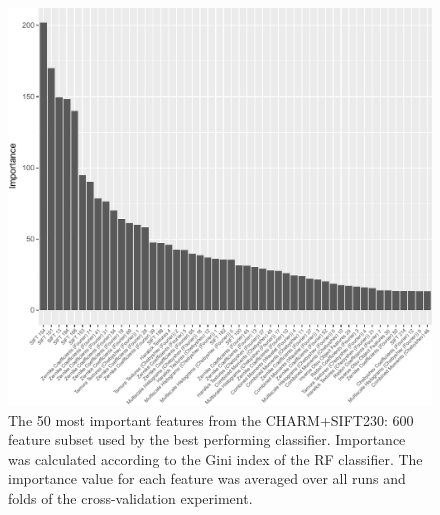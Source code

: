 \begin{figure}
	\centering
	\includegraphics[width=\columnwidth]{fig08}
	\caption{\color{red}The 50 most important features from the CHARM+SIFT230: 600 feature subset used by the best performing classifier. Importance was calculated according to the Gini index of the RF classifier. The importance value for each feature was averaged over all runs and folds of the cross-validation experiment.}
	\label{fig:importanceFeatures}
\end{figure}

